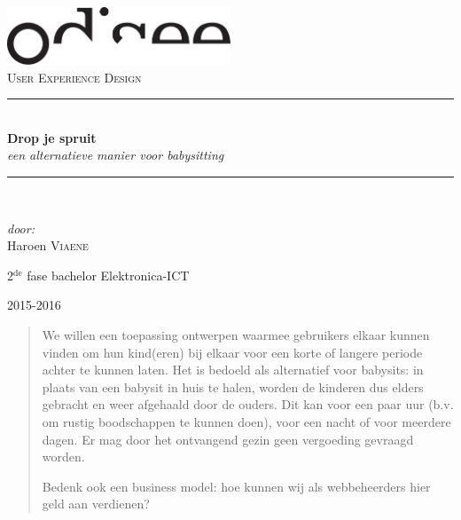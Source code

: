 \documentclass[a4paper,12pt]{article}
\newcommand{\HRule}{\rule{\linewidth}{0.5mm}}
\begin{document}
\begin{titlepage}
\begin{center}
\includegraphics[width=0.5\textwidth]{./logo.pdf}~\\[1cm]


\textsc{\Large User Experience Design}\\[0.5cm]

\HRule \\[0.4cm]
{ \LARGE \bfseries Drop je spruit}\\[0.4cm]
{\large \emph{een alternatieve manier voor babysitting}}\\[0.2cm]

\HRule \\[1.5cm]

\begin{minipage}{0.4\textwidth}
\begin{flushleft} \large
\emph{door:}\\
Haroen \textsc{Viaene}\\

\end{flushleft}
\end{minipage}
\begin{minipage}{0.4\textwidth}
\begin{flushright} \large
\large{2$^{\text{de}}$ fase bachelor Elektronica-ICT}\\
\end{flushright}
\end{minipage}

\vfill

{\large 2015-2016}

\end{center}
\end{titlepage}

\newpage

\tableofcontents

\newpage
\begin{abstract}
We willen een toepassing ontwerpen waarmee gebruikers elkaar kunnen vinden om hun kind(eren) bij elkaar voor een korte of langere periode achter te kunnen laten. Het is bedoeld als alternatief voor babysits: in plaats van een babysit in huis te halen, worden de kinderen dus elders gebracht en weer afgehaald door de ouders. Dit kan voor een paar uur (b.v. om rustig boodschappen te kunnen doen), voor een nacht of voor meerdere dagen. Er mag door het ontvangend gezin geen vergoeding gevraagd worden.

Bedenk ook een business model: hoe kunnen wij als webbeheerders hier geld aan verdienen?
\end{abstract}
\end{document}
